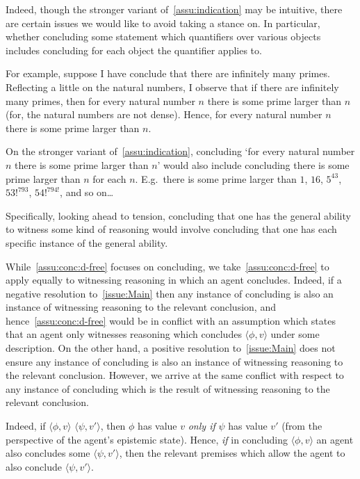 \begin{note}
  Indeed, though the stronger variant of~\autoref{assu:indication} may be intuitive, there are certain issues we would like to avoid taking a stance on.
  In particular, whether concluding some statement which quantifiers over various objects includes concluding for each object the quantifier applies to.

  For example, suppose I have conclude that there are infinitely many primes.
  Reflecting a little on the natural numbers, I observe that if there are infinitely many primes, then for every natural number \(n\) there is some prime larger than \(n\) (for, the natural numbers are not dense).
  Hence, for every natural number \(n\) there is some prime larger than \(n\).

  On the stronger variant of~\autoref{assu:indication}, concluding `for every natural number \(n\) there is some prime larger than \(n\)' would also include concluding there is some prime larger than \(n\) for each \(n\).
  E.g.\ there is some prime larger than \(1\), \(16\), \(5^{43}\), \(53!^{793}\), \(54!^{794!}\), and so on\dots

  Specifically, looking ahead to tension, concluding that one has the general ability to witness some kind of reasoning would involve concluding that one has each specific instance of the general ability.
\end{note}

\begin{note}[Witnessing]
    While~\autoref{assu:conc:d-free} focuses on concluding, we take~\autoref{assu:conc:d-free} to apply equally to witnessing reasoning in which an agent concludes.
  Indeed, if a negative resolution to~\autoref{issue:Main} then any instance of concluding is also an instance of witnessing reasoning to the relevant conclusion, and hence~\autoref{assu:conc:d-free} would be in conflict with an assumption which states that an agent only witnesses reasoning which concludes \(\langle \phi,v \rangle\) under some description.
  On the other hand, a positive resolution to~\autoref{issue:Main} does not ensure any instance of concluding is also an instance of witnessing reasoning to the relevant conclusion.
  However, we arrive at the same conflict with respect to any instance of concluding which is the result of witnessing reasoning to the relevant conclusion.

  Indeed, if \(\langle \phi,v \rangle\) \indicatePr{} \(\langle \psi,v' \rangle\), then \(\phi\) has value \(v\) \emph{only if} \(\psi\) has value \(v'\) (from the perspective of the agent's epistemic state).
  Hence, \emph{if} in concluding \(\langle \phi,v \rangle\) an agent also concludes some \indicateVed{} \(\langle \psi,v' \rangle\), then the relevant premises which allow the agent to also conclude \(\langle \psi,v' \rangle\).
\end{note}

